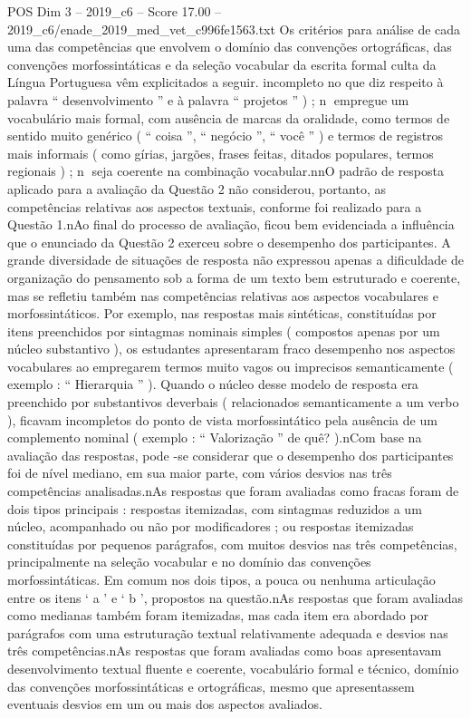 \begin{textsample}{POS Dim 3 – 2019\_c6 – Score 17.00 – 2019\_c6/enade\_2019\_med\_vet\_c996fe1563.txt}
Os critérios para análise de cada uma das competências que envolvem o domínio das convenções ortográficas, das convenções morfossintáticas e da seleção vocabular da escrita formal culta da Língua Portuguesa vêm explicitados a seguir. incompleto no que diz respeito à palavra “ desenvolvimento ” e à palavra “ projetos ” ) ; n empregue um vocabulário mais formal, com ausência de marcas da oralidade, como termos de sentido muito genérico ( “ coisa ”, “ negócio ”, “ você ” ) e termos de registros mais informais ( como gírias, jargões, frases feitas, ditados populares, termos regionais ) ; n seja coerente na combinação vocabular.nnO padrão de resposta aplicado para a avaliação da Questão 2 não considerou, portanto, as competências relativas aos aspectos textuais, conforme foi realizado para a Questão 1.nAo final do processo de avaliação, ficou bem evidenciada a influência que o enunciado da Questão 2 exerceu sobre o desempenho dos participantes.
A grande diversidade de situações de resposta não expressou apenas a dificuldade de organização do pensamento sob a forma de um texto bem estruturado e coerente, mas se refletiu também nas competências relativas aos aspectos vocabulares e morfossintáticos.
Por exemplo, nas respostas mais sintéticas, constituídas por itens preenchidos por sintagmas nominais simples ( compostos apenas por um núcleo substantivo ), os estudantes apresentaram fraco desempenho nos aspectos vocabulares ao empregarem termos muito vagos ou imprecisos semanticamente ( exemplo : “ Hierarquia ” ).
Quando o núcleo desse modelo de resposta era preenchido por substantivos deverbais ( relacionados semanticamente a um verbo ), ficavam incompletos do ponto de vista morfossintático pela ausência de um complemento nominal ( exemplo : “ Valorização ” de quê? ).nCom base na avaliação das respostas, pode -se considerar que o desempenho dos participantes foi de nível mediano, em sua maior parte, com vários desvios nas três competências analisadas.nAs respostas que foram avaliadas como fracas foram de dois tipos principais : respostas itemizadas, com sintagmas reduzidos a um núcleo, acompanhado ou não por modificadores ; ou respostas itemizadas constituídas por pequenos parágrafos, com muitos desvios nas três competências, principalmente na seleção vocabular e no domínio das convenções morfossintáticas.
Em comum nos dois tipos, a pouca ou nenhuma articulação entre os itens ‘ a ’ e ‘ b ’, propostos na questão.nAs respostas que foram avaliadas como medianas também foram itemizadas, mas cada item era abordado por parágrafos com uma estruturação textual relativamente adequada e desvios nas três competências.nAs respostas que foram avaliadas como boas apresentavam desenvolvimento textual fluente e coerente, vocabulário formal e técnico, domínio das convenções morfossintáticas e ortográficas, mesmo que apresentassem eventuais desvios em um ou mais dos aspectos avaliados.

\end{textsample}
